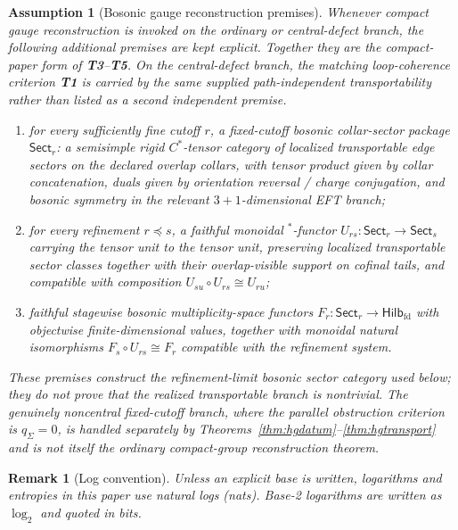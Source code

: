 \documentclass[11pt]{article}
\newtheorem{assumption}[theorem]{Assumption}
\newtheorem{remark}[theorem]{Remark}
\begin{document}
\begin{assumption}[Bosonic gauge reconstruction premises]\label{ass:gaugeprem}
Whenever compact gauge reconstruction is invoked on the ordinary or central-defect branch, the following additional premises are kept explicit. Together they are the compact-paper form of \textbf{T3}--\textbf{T5}. On the central-defect branch, the matching loop-coherence criterion \textbf{T1} is carried by the same supplied path-independent transportability rather than listed as a second independent premise.
\begin{enumerate}[label=(G\arabic*),leftmargin=2.3em]
\item for every sufficiently fine cutoff \(r\), a fixed-cutoff bosonic collar-sector package \(\mathsf{Sect}_r\): a semisimple rigid \(C^*\)-tensor category of localized transportable edge sectors on the declared overlap collars, with tensor product given by collar concatenation, duals given by orientation reversal / charge conjugation, and bosonic symmetry in the relevant \(3+1\)-dimensional EFT branch;
\item for every refinement \(r\preceq s\), a faithful monoidal \(^*\)-functor \(U_{rs}:\mathsf{Sect}_r\to\mathsf{Sect}_s\) carrying the tensor unit to the tensor unit, preserving localized transportable sector classes together with their overlap-visible support on cofinal tails, and compatible with composition \(U_{su}\!\circ U_{rs}\cong U_{ru}\);
\item faithful stagewise bosonic multiplicity-space functors \(F_r:\mathsf{Sect}_r\to\mathsf{Hilb}_{\mathrm{fd}}\) with objectwise finite-dimensional values, together with monoidal natural isomorphisms \(F_s\!\circ U_{rs}\cong F_r\) compatible with the refinement system.
\end{enumerate}
These premises construct the refinement-limit bosonic sector category used below; they do not prove that the realized transportable branch is nontrivial. The genuinely noncentral fixed-cutoff branch, where the parallel obstruction criterion is \(q_\Sigma=0\), is handled separately by Theorems~\ref{thm:hgdatum}--\ref{thm:hgtransport} and is not itself the ordinary compact-group reconstruction theorem.
\end{assumption}

\begin{remark}[Log convention]
Unless an explicit base is written, logarithms and entropies in this paper use natural logs (nats). Base-2 logarithms are written as \(\log_2\) and quoted in bits.
\end{remark}
\end{document}
